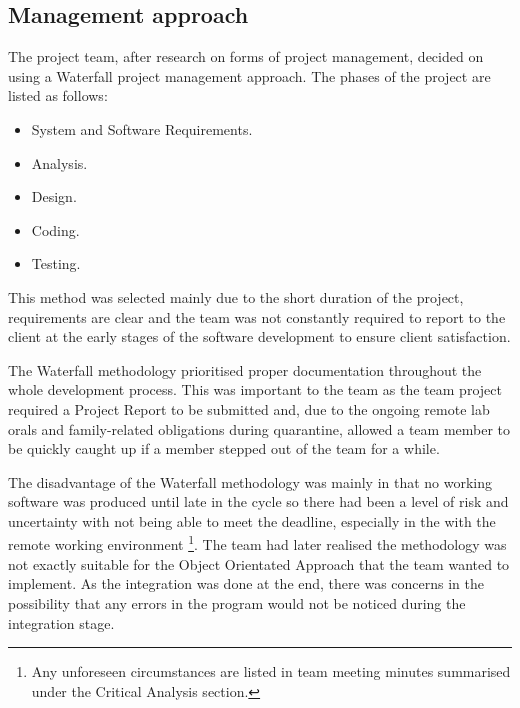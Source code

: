 \documentclass[12pt,a4paper]{article}
\begin{document}
	\subsection{Management approach}
	The project team, after research on forms of project management, decided on using a Waterfall project
	management approach. The phases of the project are listed as follows: \par
	\begin{itemize}
		\item System and Software Requirements.
		\item Analysis.
		\item Design.
		\item Coding.
		\item Testing.
	\end{itemize}
	This method was selected mainly due to the short duration of the project, requirements are clear and the team 
	was not constantly required to report to the client at the early stages of the software development to ensure 
	client satisfaction. \par

	The Waterfall methodology prioritised proper documentation throughout the whole development process. This was important
	to the team as the team project required a Project Report to be submitted and, due to the ongoing remote lab orals and 
	family-related obligations during quarantine, allowed a team member to be quickly caught up if a member stepped out
	of the team for a while.  

	The disadvantage of the Waterfall methodology was mainly in that no working software was produced until late in the 
	cycle so there had been a level of risk and uncertainty with not being able to meet the deadline, especially in the 
	with the remote working environment \footnote{Any unforeseen circumstances are listed in team meeting minutes 
	summarised under the Critical Analysis section.}. 
	The team had later realised the methodology was not exactly suitable for the Object Orientated Approach 
	that the team wanted to implement. As the integration was done at the end, there was concerns in the possibility that any errors
	in the program would not be noticed during the integration stage.

	\vfill
	\pagebreak
\end{document}
